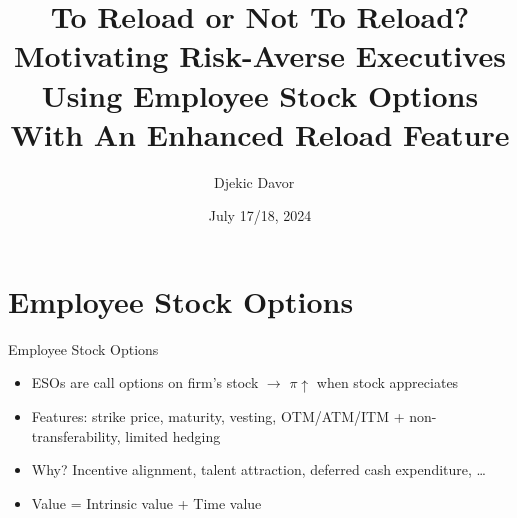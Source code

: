 \documentclass{beamer}
\title[To Reload or Not To Reload?] %
{To Reload or Not To Reload? \\ Motivating Risk-Averse Executives Using Employee Stock Options With An Enhanced Reload Feature}
\subtitle{}
\author[Djekic D.] %
{Djekic Davor \ \inst{1}}
\institute[] %
{
  \inst{1}%
  Bocconi University
}
\date[July 2024] %
{July 17/18, 2024}
\begin{document}
\frame{\titlepage}



\frame{\tableofcontents}


\section{Employee Stock Options}
\begin{frame}{Employee Stock Options}
    \begin{itemize}
        \item ESOs are call options on firm’s stock $\rightarrow$ $\pi \uparrow$ when stock appreciates
        \item Features: strike price, maturity, vesting, OTM/ATM/ITM  +  non-transferability, limited hedging
        \item Why? Incentive alignment, talent attraction, deferred cash expenditure, \dots
        \item Value = Intrinsic value + Time value 
    \end{itemize}

    \vspace{10pt}
    \begin{figure}[!h]
        \centering
    \end{figure}
    

\end{frame}
\end{document}
